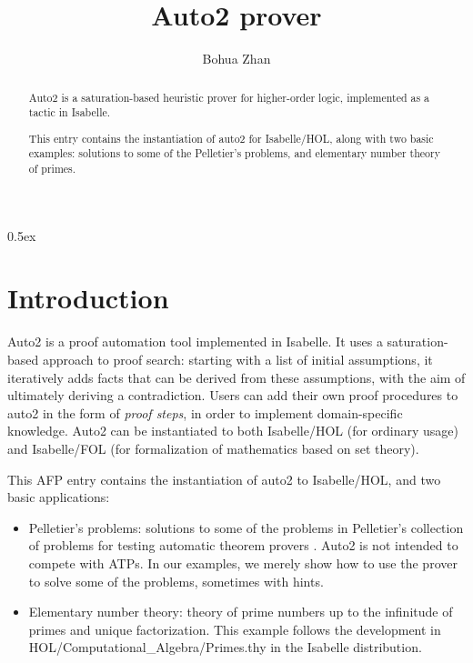 \documentclass[11pt,a4paper]{article}
\begin{document}
\title{Auto2 prover}
\author{Bohua Zhan}
\maketitle

\begin{abstract}
  Auto2 is a saturation-based heuristic prover for higher-order logic,
  implemented as a tactic in Isabelle.

  This entry contains the instantiation of auto2 for Isabelle/HOL,
  along with two basic examples: solutions to some of the Pelletier's
  problems, and elementary number theory of primes.
\end{abstract}

\newpage
\tableofcontents
\newpage
\parindent 0pt\parskip 0.5ex

\section{Introduction}

Auto2 \cite{zhan16} is a proof automation tool implemented in
Isabelle. It uses a saturation-based approach to proof search:
starting with a list of initial assumptions, it iteratively adds facts
that can be derived from these assumptions, with the aim of ultimately
deriving a contradiction. Users can add their own proof procedures to
auto2 in the form of \emph{proof steps}, in order to implement
domain-specific knowledge. Auto2 can be instantiated to both
Isabelle/HOL (for ordinary usage) and Isabelle/FOL (for formalization
of mathematics based on set theory).

This AFP entry contains the instantiation of auto2 to Isabelle/HOL,
and two basic applications:

\begin{itemize}
\item Pelletier's problems: solutions to some of the problems in
  Pelletier's collection of problems for testing automatic theorem
  provers \cite{pelletier}. Auto2 is not intended to compete with
  ATPs. In our examples, we merely show how to use the prover to solve
  some of the problems, sometimes with hints.

\item Elementary number theory: theory of prime numbers up to the
  infinitude of primes and unique factorization. This example follows
  the development in HOL/Computational\_Algebra/Primes.thy in the
  Isabelle distribution.

\end{itemize}





\end{document}
